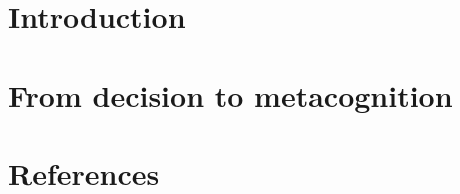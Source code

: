 \documentclass[12pt,a4paper]{book}
\date{TBD}
\begin{document}
\frontmatter


\setcounter{tocdepth}{3}
\tableofcontents
\listoffigures
\listoftables
\listoftodos

\mainmatter
\part{Introduction}


\part{From decision to metacognition}



\backmatter
\part{References}
\printglossaries
\printbibliography[heading=bibintoc]
\end{document}
